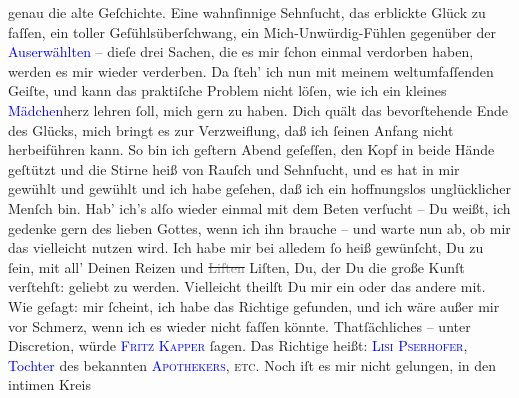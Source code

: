 \documentclass[twoside=false,titlepage=false,open=any, parskip=never, fontsize=12pt, headings=small, chapterprefix=false, appendixprefix=false]{scrbook}
\newcommand{\strikeout}[1]{\sout{#1}}
\newcommand{\pbposition}{\depth}
\newcommand{\pb}{\nobreak\hspace{0pt}\raisebox{-0.1em}{\raisebox{\pbposition}{\textnormal{|}}}\nobreak\hspace{0pt}}
\begin{document}
               genau die alte Geſchichte. Eine wahnſinnige Sehnſucht, das erblickte Glück zu faſſen,
               ein toller Geſühlsüberſchwang, ein Mich-Unwürdig-Fühlen gegenüber der \textcolor{blue}{Auserwählten}{} – dieſe drei
               Sachen, die es mir ſchon einmal verdorben haben, werden es mir wieder verderben. Da
               ſteh’ ich {\pb}nun mit meinem
               weltumfaſſenden Geiſte, und kann das praktiſche Problem nicht löſen, wie ich ein
               kleines \textcolor{blue}{Mädchen}{}herz lehren
               ſoll, mich gern zu haben. Dich quält das bevorſtehende Ende des Glücks, mich bringt
               es zur Verzweiflung, daß ich ſeinen Anfang nicht herbeiführen kann. So bin ich geſtern{ }Abend geſeſſen, den Kopf in beide Hände geſtützt und die Stirne heiß von
               Rauſch und Sehnſucht, und es hat in mir gewühlt und gewühlt und ich habe geſehen, daß
               ich ein hoffnungslos unglücklicher Menſch bin. Hab’ ich’s alſo wieder einmal mit dem
               Beten verſucht – Du weißt, ich gedenke gern des lieben Gottes, wenn ich ihn brauche –
               und warte nun ab, ob mir das vielleicht nutzen wird. Ich habe mir bei alledem ſo heiß
               gewünſcht, Du zu ſein, mit all' Deinen Reizen und \strikeout{\textcolor{gray}{Liſten}} Liſten, Du, der Du die große Kunſt verſtehſt: geliebt zu werden. Vielleicht
               theilſt Du mir ein oder das andere \label{K_L02649-3v}\label{K_L02649-3h} mit. Wie
               geſagt: mir ſcheint, ich habe das Richtige gefunden, und ich wäre außer mir vor
               Schmerz, wenn ich es wieder nicht faſſen könnte.\pend
           \pstart
           Thatſächliches – unter Discretion, würde \textsc{\textcolor{blue}{Fritz Kapper}{}\ledrightnote{\textcolor{blue}{Friedrich Kapper}}} ſagen. Das Richtige heißt: {\pb}\textsc{\textcolor{blue}{Lisi Pserhofer}{}\ledrightnote{\textcolor{blue}{Elise Pserhofer}}}, \textcolor{blue}{Tochter}{} des bekannten
                  \textsc{\textcolor{blue}{Apothekers}{}}, \label{K_L02649-11v}\label{K_L02649-11h}{ }\textsc{etc}. Noch iſt es mir nicht gelungen, in den intimen Kreis
\end{document}
